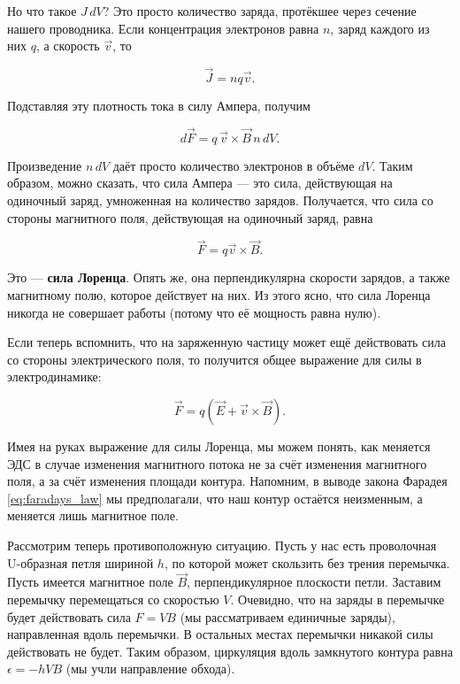\documentclass[12pt,a4paper]{article}
\numberwithin{equation}{section}
\numberwithin{equation}{section}
\newcommand{\eps}{\epsilon}
\begin{document}
Но что такое $J \, dV$? Это просто количество заряда, протёкшее через
сечение нашего проводника. Если концентрация электронов равна $n$, заряд
каждого из них $q$, а скорость $\vec{v}$, то 

\begin{equation}
  \label{eq:der_lorentz_force_2}
  \vec{J} = n q \vec{v}.
\end{equation}

Подставляя эту плотность тока в силу Ампера, получим

\begin{equation}
  \label{eq:der_lorentz_force_3}
  d\vec{F} = q \, \vec{v} \times \vec{B} \, n\, dV.
\end{equation}

Произведение $n \, dV$ даёт просто количество электронов в объёме
$dV$. Таким образом, можно сказать, что сила Ампера --- это сила,
действующая на одиночный заряд, умноженная на количество
зарядов. Получается, что сила со стороны магнитного поля, действующая
на одиночный заряд, равна

\begin{equation}
  \label{eq:lorentz_force}
  \vec{F} = q \vec{v} \times \vec{B}.
\end{equation}

Это --- \textbf{сила Лоренца}. Опять же, она перпендикулярна скорости
зарядов, а также магнитному полю, которое действует на них. Из этого
ясно, что сила Лоренца никогда не совершает работы (потому что её
мощность равна нулю). 

Если теперь вспомнить, что на заряженную частицу может ещё действовать
сила со стороны электрического поля, то получится общее выражение для
силы в электродинамике:

\begin{equation}
  \label{eq:force_electrodynamics}
  \vec{F} = q (\vec{E} + \vec{v} \times \vec{B}).
\end{equation}

Имея на руках выражение для силы Лоренца, мы можем понять, как
меняется ЭДС в случае изменения магнитного потока не за счёт изменения
магнитного поля, а за счёт изменения площади контура. Напомним, в
выводе закона Фарадея \eqref{eq:faradays_law} мы предполагали, что наш
контур остаётся неизменным, а меняется лишь магнитное поле. 

Рассмотрим теперь противоположную ситуацию. Пусть у нас есть
проволочная U-образная петля шириной $h$, по которой может скользить без трения
перемычка. Пусть имеется магнитное поле $\vec{B}$, перпендикулярное
плоскости петли. Заставим перемычку перемещаться со скоростью
$V$. Очевидно, что на заряды в перемычке будет действовать сила $F =
V B$ (мы рассматриваем единичные заряды), направленная вдоль
перемычки. В остальных местах перемычки никакой силы действовать не
будет. Таким образом, циркуляция вдоль замкнутого контура равна
$\eps=-hVB$ (мы учли направление обхода). 
\end{document}
